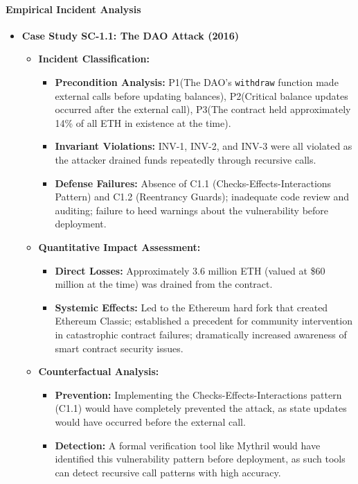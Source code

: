 \paragraph{Empirical Incident Analysis}

\begin{itemize}
\item \textbf{Case Study SC-1.1: The DAO Attack (2016)}
    \begin{itemize}
    \item \textbf{Incident Classification:}
        \begin{itemize}
        \item \textbf{Precondition Analysis:} P1\checkmark (The DAO's \texttt{withdraw} function made external calls before updating balances), P2\checkmark (Critical balance updates occurred after the external call), P3\checkmark (The contract held approximately 14\% of all ETH in existence at the time).
        \item \textbf{Invariant Violations:} INV-1, INV-2, and INV-3 were all violated as the attacker drained funds repeatedly through recursive calls.
        \item \textbf{Defense Failures:} Absence of C1.1 (Checks-Effects-Interactions Pattern) and C1.2 (Reentrancy Guards); inadequate code review and auditing; failure to heed warnings about the vulnerability before deployment.
        \end{itemize}
    
    \item \textbf{Quantitative Impact Assessment:}
        \begin{itemize}
        \item \textbf{Direct Losses:} Approximately 3.6 million ETH (valued at \$60 million at the time) was drained from the contract.
        \item \textbf{Systemic Effects:} Led to the Ethereum hard fork that created Ethereum Classic; established a precedent for community intervention in catastrophic contract failures; dramatically increased awareness of smart contract security issues.
        \end{itemize}
    
    \item \textbf{Counterfactual Analysis:}
        \begin{itemize}
        \item \textbf{Prevention:} Implementing the Checks-Effects-Interactions pattern (C1.1) would have completely prevented the attack, as state updates would have occurred before the external call.
        \item \textbf{Detection:} A formal verification tool like Mythril would have identified this vulnerability pattern before deployment, as such tools can detect recursive call patterns with high accuracy.
        \end{itemize}
    \end{itemize}
\end{itemize}

